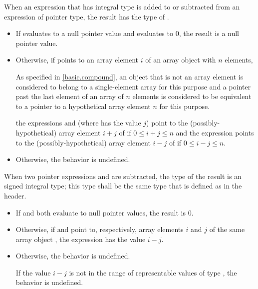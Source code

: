 \pnum
{}%
When an expression  that has integral type
is added to or subtracted from an expression  of pointer type,
the result has the type of .
\begin{itemize}
\item If  evaluates to a null pointer value and
 evaluates to 0, the result is a null pointer value.
\item Otherwise, if  points to an array element $i$
of an array object  with $n$ elements,
\begin{footnote}
As specified in \ref{basic.compound},
an object that is not an array element
is considered to belong to a single-element array for this purpose and
a pointer past the last element of an array of $n$ elements
is considered to be equivalent to a pointer to a hypothetical array element
$n$ for this purpose.
\end{footnote}
the expressions  and 
(where  has the value $j$)
point to the (possibly-hypothetical) array element
$i + j$ of  if $0 \le i + j \le n$
and the expression 
points to the (possibly-hypothetical) array element
$i - j$ of  if $0 \le i - j \le n$.
\item Otherwise, the behavior is undefined.
\end{itemize}

\pnum
{}%
%
%
%
When two pointer expressions  and  are subtracted,
the type of the result is an  signed
integral type; this type shall be the same type that is defined as
 in the 
header.
\begin{itemize}
\item If  and  both evaluate to null pointer values,
the result is 0.
\item Otherwise, if  and  point to, respectively,
array elements $i$ and $j$
of the same array object ,
the expression  has the value $i - j$.
\item Otherwise, the behavior is undefined.
\begin{note}
If the value $i - j$
is not in the range of representable values
of type ,
the behavior is undefined.
\end{note}
\end{itemize}

